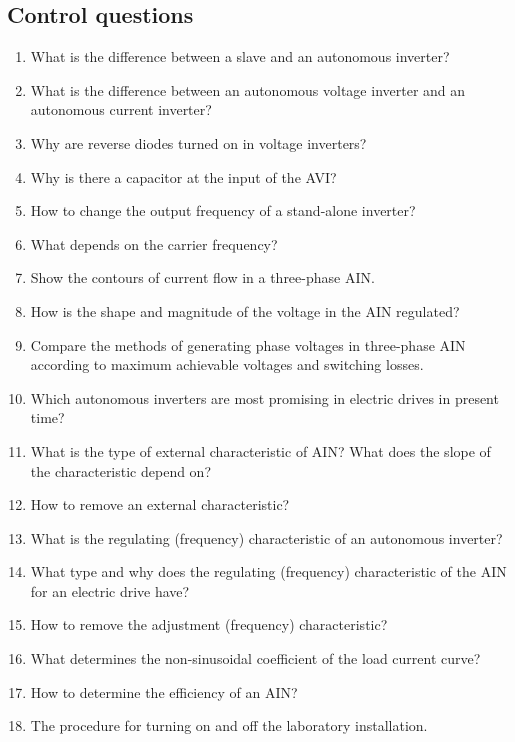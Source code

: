 \documentclass[a4paper,14pt]{article}
\begin{document}
\subsection{Control questions}
\begin{enumerate}
\item What is the difference between a slave and an autonomous inverter?
\item What is the difference between an autonomous voltage inverter and an autonomous current inverter?
\item Why are reverse diodes turned on in voltage inverters?
\item Why is there a capacitor at the input of the AVI?
\item How to change the output frequency of a stand-alone inverter?
\item What depends on the carrier frequency?
\item Show the contours of current flow in a three-phase AIN.
\item How is the shape and magnitude of the voltage in the AIN regulated?
\item Compare the methods of generating phase voltages in three-phase AIN according to maximum achievable voltages and switching losses.
\item Which autonomous inverters are most promising in electric drives in present time?
\item What is the type of external characteristic of AIN? What does the slope of the characteristic depend on?
\item How to remove an external characteristic?
\item What is the regulating (frequency) characteristic of an autonomous inverter?
\item What type and why does the regulating (frequency) characteristic of the AIN for an electric drive have?
\item How to remove the adjustment (frequency) characteristic?
\item What determines the non-sinusoidal coefficient of the load current curve?
\item How to determine the efficiency of an AIN?
\item The procedure for turning on and off the laboratory installation.
\end{enumerate}
\end{document}
